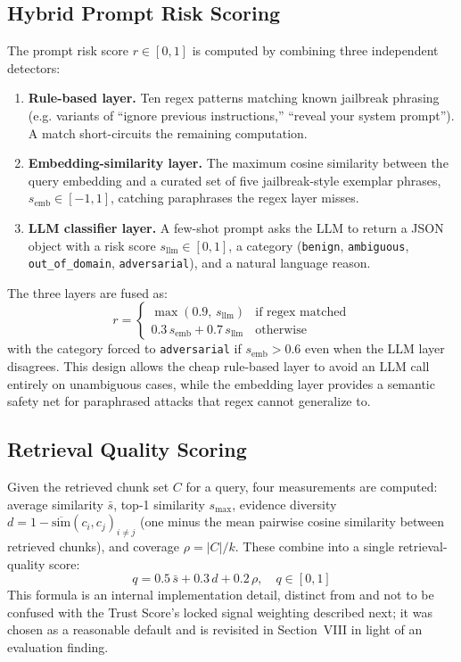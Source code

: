 \documentclass[conference]{IEEEtran}
\begin{document}
\subsection{Hybrid Prompt Risk Scoring}
The prompt risk score $r \in [0,1]$ is computed by combining three independent
detectors:
\begin{enumerate}
  \item \textbf{Rule-based layer.} Ten regex patterns matching known jailbreak phrasing
  (e.g. variants of ``ignore previous instructions,'' ``reveal your system prompt'').
  A match short-circuits the remaining computation.
  \item \textbf{Embedding-similarity layer.} The maximum cosine similarity between the
  query embedding and a curated set of five jailbreak-style exemplar phrases,
  $s_{\text{emb}} \in [-1,1]$, catching paraphrases the regex layer misses.
  \item \textbf{LLM classifier layer.} A few-shot prompt asks the LLM to return a JSON
  object with a risk score $s_{\text{llm}} \in [0,1]$, a category (\texttt{benign},
  \texttt{ambiguous}, \texttt{out\_of\_domain}, \texttt{adversarial}), and a natural
  language reason.
\end{enumerate}
The three layers are fused as:
\begin{equation}
r =
\begin{cases}
\max(0.9,\, s_{\text{llm}}) & \text{if regex matched} \\
0.3\, s_{\text{emb}} + 0.7\, s_{\text{llm}} & \text{otherwise}
\end{cases}
\end{equation}
with the category forced to \texttt{adversarial} if $s_{\text{emb}} > 0.6$ even when the
LLM layer disagrees. This design allows the cheap rule-based layer to avoid an LLM call
entirely on unambiguous cases, while the embedding layer provides a semantic safety net
for paraphrased attacks that regex cannot generalize to.

\subsection{Retrieval Quality Scoring}
Given the retrieved chunk set $C$ for a query, four measurements are computed:
average similarity $\bar{s}$, top-1 similarity $s_{\max}$, evidence diversity $d = 1 -
\overline{\text{sim}}(c_i, c_j)_{i \neq j}$ (one minus the mean pairwise cosine similarity
between retrieved chunks), and coverage $\rho = |C| / k$. These combine into a single
retrieval-quality score:
\begin{equation}
q = 0.5\,\bar{s} + 0.3\,d + 0.2\,\rho, \quad q \in [0,1]
\end{equation}
This formula is an internal implementation detail, distinct from and not to be confused
with the Trust Score's locked signal weighting described next; it was chosen as a
reasonable default and is revisited in Section~VIII in light of an evaluation finding.
\end{document}
